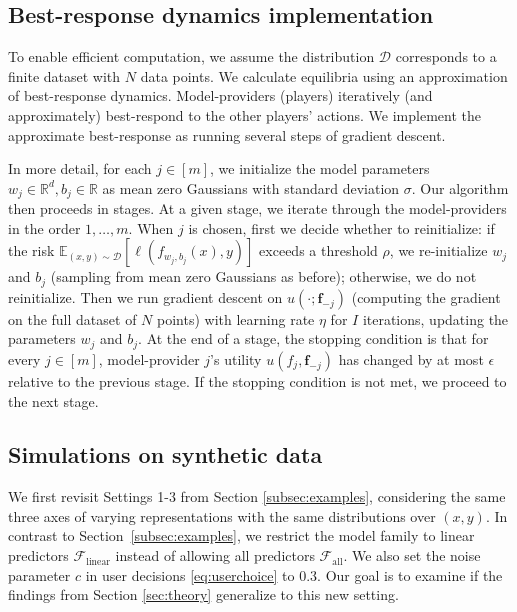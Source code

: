 \documentclass[letterpaper,11pt]{article}
\theoremstyle{plain}
\begin{document}
\subsection{Best-response dynamics implementation}
\label{subsec:bestresponsedynamics}

To enable efficient computation, we assume the distribution $\mathcal{D}$ corresponds to a finite dataset with $N$ data points. We calculate equilibria using an approximation of best-response dynamics. Model-providers (players) iteratively (and approximately) best-respond to the other players' actions. We implement the approximate best-response as running several steps of gradient descent.  

In more detail, for each $j \in [m]$, we initialize the model parameters $w_j \in \mathbb{R}^d, b_j \in \mathbb{R}$ as mean zero Gaussians with standard deviation $\sigma$. Our algorithm then proceeds in stages. At a given stage, we iterate through the model-providers in the order $1, \ldots, m$. When $j$ is chosen, first we decide whether to reinitialize: if the risk $\mathbb{E}_{(x,y) \sim \mathcal{D}}[\ell(f_{w_j, b_j}(x), y)]$ exceeds a threshold $\rho$, we re-initialize $w_j$ and $b_j$ (sampling from mean zero Gaussians as before); otherwise, we do not reinitialize. Then we run gradient descent on $u(\cdot; \mathbf{f}_{-j})$ (computing the gradient on the full dataset of $N$ points) with learning rate $\eta$ for $I$ iterations, updating the parameters $w_j$ and $b_j$. At the end of a stage, the stopping condition is that for every $j \in [m]$, model-provider $j$'s utility $u(f_j, \mathbf{f}_{-j})$ has changed by at most $\epsilon$ relative to the previous stage. If the stopping condition is not met, we proceed to the next stage. 

\subsection{Simulations on synthetic data}\label{subsec:synthetic}

We first revisit Settings 1-3 from Section \ref{subsec:examples}, considering the same three axes of varying representations with the same distributions over $(x,y)$. In contrast to Section~\ref{subsec:examples}, we restrict the model family to linear predictors $\mathcal{F}_{\text{linear}}$ instead of allowing all predictors $\mathcal{F}_{\text{all}}$. We also set the noise parameter $c$ in user decisions \eqref{eq:userchoice} to $0.3$. Our goal is to examine if the findings from Section \ref{sec:theory} generalize to this new setting. 
\end{document}

